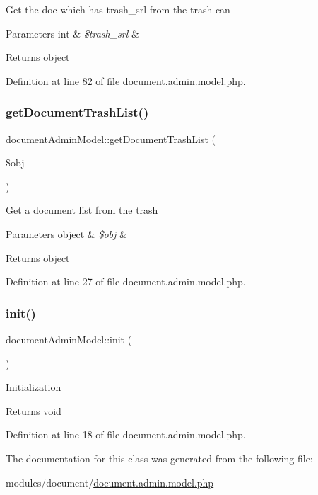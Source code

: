 Get the doc which has trash\+\_\+srl from the trash can 
\begin{DoxyParams}[1]{Parameters}
int & {\em \$trash\+\_\+srl} & \\
\hline
\end{DoxyParams}
\begin{DoxyReturn}{Returns}
object 
\end{DoxyReturn}


Definition at line 82 of file document.\+admin.\+model.\+php.

\hypertarget{classdocumentAdminModel_a2dde1d3304ebc18a52a841aee71b4fad}{}\label{classdocumentAdminModel_a2dde1d3304ebc18a52a841aee71b4fad} 
\subsubsection{\texorpdfstring{get\+Document\+Trash\+List()}{getDocumentTrashList()}}
{\footnotesize\ttfamily document\+Admin\+Model\+::get\+Document\+Trash\+List (\begin{DoxyParamCaption}\item[{}]{\$obj }\end{DoxyParamCaption})}

Get a document list from the trash 
\begin{DoxyParams}[1]{Parameters}
object & {\em \$obj} & \\
\hline
\end{DoxyParams}
\begin{DoxyReturn}{Returns}
object 
\end{DoxyReturn}


Definition at line 27 of file document.\+admin.\+model.\+php.

\hypertarget{classdocumentAdminModel_aa2d2c19a8a236499b03c085bbf578c11}{}\label{classdocumentAdminModel_aa2d2c19a8a236499b03c085bbf578c11} 
\subsubsection{\texorpdfstring{init()}{init()}}
{\footnotesize\ttfamily document\+Admin\+Model\+::init (\begin{DoxyParamCaption}{ }\end{DoxyParamCaption})}

Initialization \begin{DoxyReturn}{Returns}
void 
\end{DoxyReturn}


Definition at line 18 of file document.\+admin.\+model.\+php.



The documentation for this class was generated from the following file\+:\begin{DoxyCompactItemize}
\item 
modules/document/\hyperlink{document_8admin_8model_8php}{document.\+admin.\+model.\+php}\end{DoxyCompactItemize}
